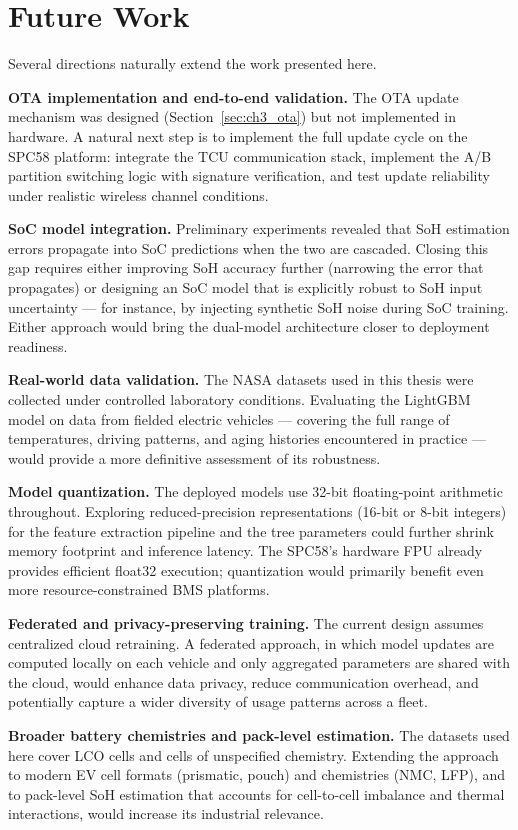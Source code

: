 \section{Future Work}

Several directions naturally extend the work presented here.

\textbf{OTA implementation and end-to-end validation.} The OTA update mechanism was designed (Section~\ref{sec:ch3_ota}) but not implemented in hardware. A natural next step is to implement the full update cycle on the SPC58 platform: integrate the TCU communication stack, implement the A/B partition switching logic with signature verification, and test update reliability under realistic wireless channel conditions.

\textbf{SoC model integration.} Preliminary experiments revealed that SoH estimation errors propagate into SoC predictions when the two are cascaded. Closing this gap requires either improving SoH accuracy further (narrowing the error that propagates) or designing an SoC model that is explicitly robust to SoH input uncertainty --- for instance, by injecting synthetic SoH noise during SoC training. Either approach would bring the dual-model architecture closer to deployment readiness.

\textbf{Real-world data validation.} The NASA datasets used in this thesis were collected under controlled laboratory conditions. Evaluating the LightGBM model on data from fielded electric vehicles --- covering the full range of temperatures, driving patterns, and aging histories encountered in practice --- would provide a more definitive assessment of its robustness.

\textbf{Model quantization.} The deployed models use 32-bit floating-point arithmetic throughout. Exploring reduced-precision representations (16-bit or 8-bit integers) for the feature extraction pipeline and the tree parameters could further shrink memory footprint and inference latency. The SPC58's hardware FPU already provides efficient float32 execution; quantization would primarily benefit even more resource-constrained BMS platforms.

\textbf{Federated and privacy-preserving training.} The current design assumes centralized cloud retraining. A federated approach, in which model updates are computed locally on each vehicle and only aggregated parameters are shared with the cloud, would enhance data privacy, reduce communication overhead, and potentially capture a wider diversity of usage patterns across a fleet.

\textbf{Broader battery chemistries and pack-level estimation.} The datasets used here cover LCO cells and cells of unspecified chemistry. Extending the approach to modern EV cell formats (prismatic, pouch) and chemistries (NMC, LFP), and to pack-level SoH estimation that accounts for cell-to-cell imbalance and thermal interactions, would increase its industrial relevance.
